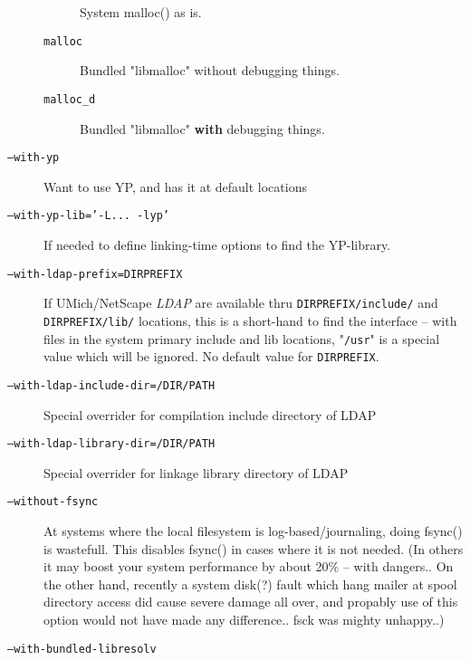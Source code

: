 \begin{description}
\begin{description}
System malloc() as is.

\item[\tt malloc] \mbox{}

Bundled "libmalloc" without debugging things.

\item[\tt malloc\_d] \mbox{}

Bundled "libmalloc" {\bf with} debugging things.
\end{description}

\item[\tt --with-yp] \mbox{}

Want to use YP, and has it at default locations

\item[\tt --with-yp-lib='-L... -lyp'] \mbox{}

If needed to define linking-time options to find the YP-library.

\item[\tt --with-ldap-prefix=DIRPREFIX] \mbox{}

If UMich/NetScape {\em LDAP} are available thru {\tt DIRPREFIX/include/}
and {\tt DIRPREFIX/lib/} locations, this is a short-hand to find
the interface -- with files in the system primary include
and lib locations,  "{\tt /usr}" is a special value which will be
ignored.  No default value for {\tt DIRPREFIX}.

\item[\tt --with-ldap-include-dir=/DIR/PATH] \mbox{}

Special overrider for compilation include directory of LDAP

\item[\tt --with-ldap-library-dir=/DIR/PATH] \mbox{}

Special overrider for linkage library directory of LDAP

\item[\tt --without-fsync] \mbox{}

At systems where the local filesystem is log-based/journaling,
doing   fsync()  is wastefull.  This disables fsync() in
cases where it is not needed.    (In others it may boost
your system performance by about 20\% -- with dangers..
On the other hand, recently a system disk(?) fault which
hang mailer at spool directory access did cause severe
damage all over, and propably use of this option would
not have made any difference..  fsck was mighty unhappy..)

\item[\tt --with-bundled-libresolv] \mbox{}


\end{description}
